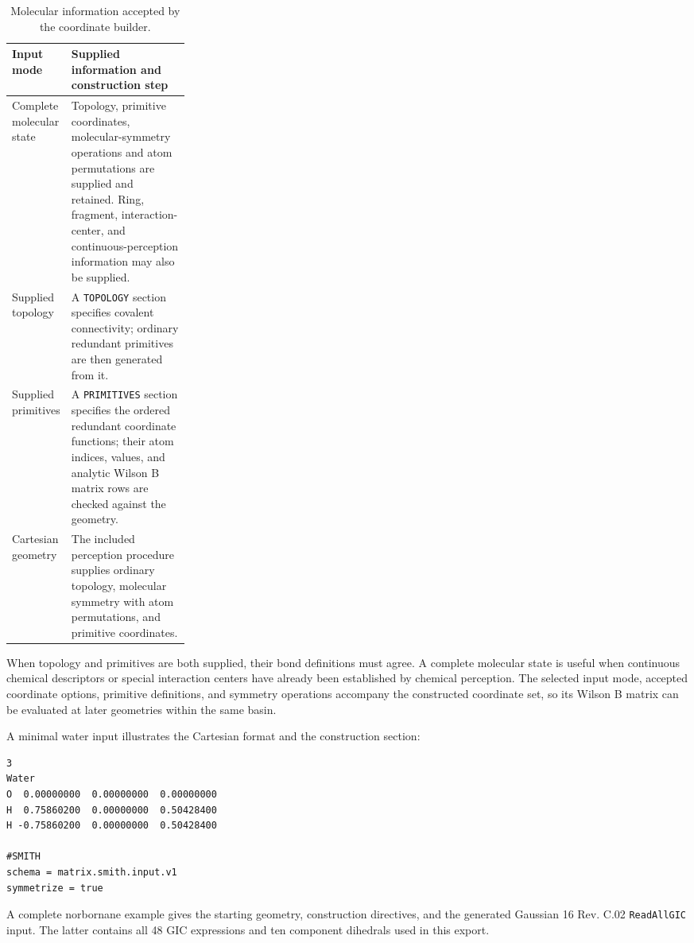 \documentclass[10pt]{article}
\begin{document}
{
\begin{table}[htbp]
\centering
\small
\caption{{Molecular information accepted by the coordinate builder.}}
\label{tab:si-builder-input}
\begin{tabularx}{\linewidth}{@{}>{\raggedright\arraybackslash}p{0.26\linewidth}X@{}}
\toprule
Input mode & Supplied information and construction step \\
\midrule
Complete molecular state & Topology, primitive coordinates, molecular-symmetry
operations and atom permutations are supplied and retained. Ring, fragment,
interaction-center, and continuous-perception information may also be supplied. \\
Supplied topology & A \texttt{TOPOLOGY} section specifies covalent connectivity;
ordinary redundant primitives are then generated from it. \\
Supplied primitives & A \texttt{PRIMITIVES} section specifies the ordered
redundant coordinate functions; their atom indices, values, and analytic Wilson
B matrix rows are checked against the geometry. \\
Cartesian geometry & The included perception procedure supplies ordinary
topology, molecular symmetry with atom permutations, and primitive coordinates. \\
\bottomrule
\end{tabularx}
\end{table}
}

{When topology and primitives are both supplied, their bond
definitions must agree. A complete molecular state is useful when continuous
chemical descriptors or special interaction centers have already been
established by chemical perception. The selected input mode, accepted coordinate options,
primitive definitions, and symmetry operations accompany the constructed
coordinate set, so its Wilson B matrix can be evaluated at later geometries
within the same basin.}

{A minimal water input illustrates the Cartesian format and
the construction section:}
\begin{lstlisting}[basicstyle=\ttfamily\scriptsize]
3
Water
O  0.00000000  0.00000000  0.00000000
H  0.75860200  0.00000000  0.50428400
H -0.75860200  0.00000000  0.50428400

#SMITH
schema = matrix.smith.input.v1
symmetrize = true
\end{lstlisting}


{A complete norbornane example gives the starting geometry,
construction directives, and the generated Gaussian 16 Rev. C.02
\texttt{ReadAllGIC} input. The latter contains all 48 GIC expressions and ten
component dihedrals used in this export.}
\end{document}

